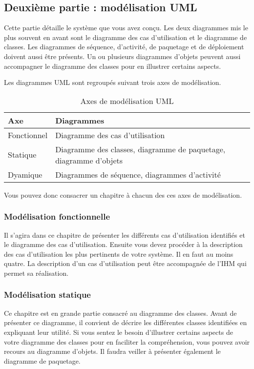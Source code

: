 \documentclass[12pt]{article}
\begin{document}
\subsection{Deuxième partie : modélisation UML}
Cette partie détaille le système que vous avez conçu. Les deux diagrammes mis le plus souvent en avant sont le diagramme des cas d'utilisation et le diagramme de classes. Les diagrammes de séquence, d'activité, de paquetage et de déploiement doivent aussi être présents. Un ou plusieurs diagrammes d'objets peuvent aussi accompagner le diagramme des classes pour en illustrer certains aspects.

Les diagrammes UML sont regroupés suivant trois axes de modélisation.

\begin{table}[!h]
  \begin{tabular}{|l|l|}
    \hline
    Axe & Diagrammes \\
    \hline
    Fonctionnel & Diagramme des cas d'utilisation \\
    \hline
    Statique & Diagramme des classes, diagramme de paquetage, diagramme d'objets \\
    \hline
    Dyamique & Diagrammes de séquence, diagrammes d'activité \\
    \hline
  \end{tabular}
  \caption{Axes de modélisation UML}
\end{table}

Vous pouvez donc consacrer un chapitre à chacun des ces axes de modélisation.

\subsubsection{Modélisation fonctionnelle}
Il s'agira dans ce chapitre de présenter les différents cas d'utilisation identifiés et le diagramme des cas d'utilisation. Ensuite vous devez procéder à la description des cas d'utilisation les plus pertinents de votre système. Il en faut au moins quatre. La description d'un cas d'utilisation peut être accompagnée de l'IHM qui permet sa réalisation.

\subsubsection{Modélisation statique}
Ce chapitre est en grande partie consacré au diagramme des classes. Avant de présenter ce diagramme, il convient de décrire les différentes classes identifiées en expliquant leur utilité. Si vous sentez le besoin d'illustrer certains aspects de votre diagramme des classes pour en faciliter la compréhension, vous pouvez avoir recours au diagramme d'objets. Il faudra veiller à présenter également le diagramme de paquetage.
\end{document}
